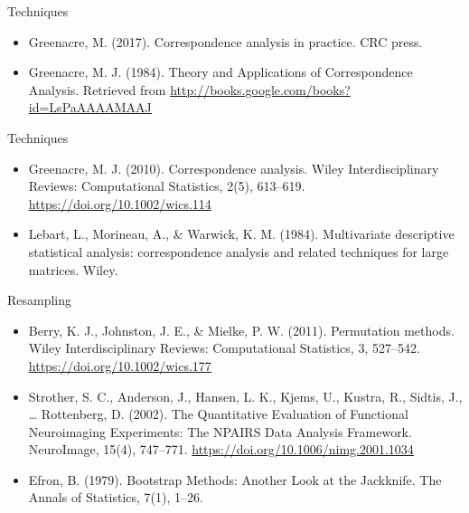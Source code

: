 \documentclass[
  ignorenonframetext,
]{beamer}
\begin{document}
\begin{frame}{Techniques}
\protect\hypertarget{techniques}{}

\begin{itemize}[<+->]
\item
  Greenacre, M. (2017). Correspondence analysis in practice. CRC press.
\item
  Greenacre, M. J. (1984). Theory and Applications of Correspondence
  Analysis. Retrieved from
  \url{http://books.google.com/books?id=LsPaAAAAMAAJ}
\end{itemize}

\end{frame}

\begin{frame}{Techniques}
\protect\hypertarget{techniques-1}{}

\begin{itemize}[<+->]
\item
  Greenacre, M. J. (2010). Correspondence analysis. Wiley
  Interdisciplinary Reviews: Computational Statistics, 2(5), 613--619.
  \url{https://doi.org/10.1002/wics.114}
\item
  Lebart, L., Morineau, A., \& Warwick, K. M. (1984). Multivariate
  descriptive statistical analysis: correspondence analysis and related
  techniques for large matrices. Wiley.
\end{itemize}

\end{frame}

\begin{frame}{Resampling}
\protect\hypertarget{resampling-1}{}

\begin{itemize}[<+->]
\item
  Berry, K. J., Johnston, J. E., \& Mielke, P. W. (2011). Permutation
  methods. Wiley Interdisciplinary Reviews: Computational Statistics, 3,
  527--542. \url{https://doi.org/10.1002/wics.177}
\item
  Strother, S. C., Anderson, J., Hansen, L. K., Kjems, U., Kustra, R.,
  Sidtis, J., \ldots{} Rottenberg, D. (2002). The Quantitative
  Evaluation of Functional Neuroimaging Experiments: The NPAIRS Data
  Analysis Framework. NeuroImage, 15(4), 747--771.
  \url{https://doi.org/10.1006/nimg.2001.1034}
\item
  Efron, B. (1979). Bootstrap Methods: Another Look at the Jackknife.
  The Annals of Statistics, 7(1), 1--26.
\end{itemize}

\end{frame}
\end{document}
